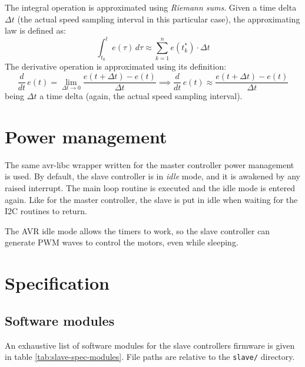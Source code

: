 The integral operation is approximated using \emph{Riemann sums}. Given a time
delta $\Delta t$ (the actual speed sampling interval in this particular case),
the approximating law is defined as:
\begin{equation}
  \int_{t_0}^t e(\tau)\,d\tau \approx \sum_{k=1}^n e(t_k^*) \cdot \Delta t
\end{equation}
The derivative operation is approximated using its
definition\cite{levy-num-analysis}:
\begin{equation}
  \frac{d}{dt}\,e(t) = \lim_{\Delta t \to 0} \frac{e(t + \Delta t) - e(t)}{\Delta t} \implies
  \frac{d}{dt}\,e(t) \approx \frac{e(t + \Delta t) - e(t)}{\Delta t}
\end{equation}
being $\Delta t$ a time delta (again, the actual speed sampling interval).


\section{Power management}
The same avr-libc wrapper written for the master controller power management is
used.
By default, the slave controller is in \emph{idle} mode, and it is awakened by
any raised interrupt. The main loop routine is executed and the idle mode is
entered again. Like for the master controller, the slave is put in idle when
waiting for the I2C routines to return.

The AVR idle mode allows the timers to work, so the slave controller can
generate PWM waves to control the motors, even while sleeping.

\section{Specification}

\subsection{Software modules}
An exhaustive list of software modules for the slave controllers firmware is
given in table \ref{tab:slave-spec-modules}. File paths are relative to the
\texttt{slave/} directory.

